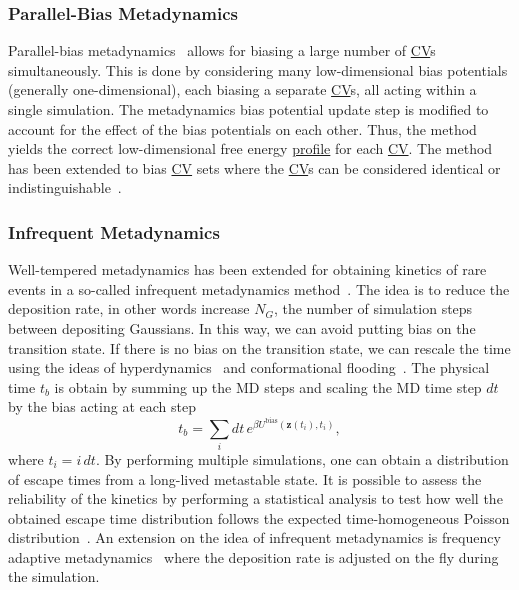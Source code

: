 \documentclass[9pt,review]{livecoms}
\newcommand{\vz}{\mathbf{z}}
\begin{document}
\subsubsection{Parallel-Bias Metadynamics}
\label{sec:pb-metad}
Parallel-bias metadynamics~\cite{Pfaendtner2015_pbmetad} allows for biasing a large number of \hyperlink{ref:CV} {CV}s simultaneously. This is done by considering many low-dimensional bias potentials (generally one-dimensional), each biasing a separate \hyperlink{ref:CV} {CV}s, all acting within a single simulation.  The metadynamics bias potential update step is modified to account for the effect of the bias potentials on each other. Thus, the method yields the correct low-dimensional free energy \hyperlink{ref:FES} {profile} for each \hyperlink{ref:CV} {CV}. The method has been extended to bias \hyperlink{ref:CV} {CV} sets where the \hyperlink{ref:CV} {CV}s can be considered identical or indistinguishable~\cite{Prakash2018_pbmetad-families}.


\subsubsection{Infrequent Metadynamics}
Well-tempered metadynamics has been extended for obtaining kinetics of rare events in a so-called infrequent metadynamics method~\cite{Tiwary-PRL-2013}. The idea is to reduce the deposition rate, in other words increase $N_{G}$, the number of simulation steps between depositing Gaussians. In this way, we can avoid putting bias on the transition state. If there is no bias on the transition state, we can rescale the time using the ideas of hyperdynamics~\cite{Voter-PRL-1997} and conformational flooding~\cite{Grubmuller-PRE-1995}. The physical time $t_b$ is obtain by summing up the MD steps and scaling the MD time step $dt$ by the bias acting at each step
\begin{equation}
\label{wtmetad_hyperdynamics}
t_b = \sum_{i} dt \, e^{\beta U^{\mathrm{bias}}(\vz(t_{i}),t_{i})},
\end{equation}
where $t_{i} = i\, dt$. By performing multiple simulations, one can obtain a distribution of escape times from a long-lived metastable state. It is possible to assess the reliability of the kinetics by performing a statistical analysis to test how well the obtained escape time distribution follows the expected time-homogeneous Poisson distribution~\cite{KS_Test_JCTC_2014}. An extension on the idea of infrequent metadynamics is frequency adaptive metadynamics~\cite{Wang2018_FA-MetaD} where the deposition rate is adjusted on the fly during the simulation.
\end{document}
